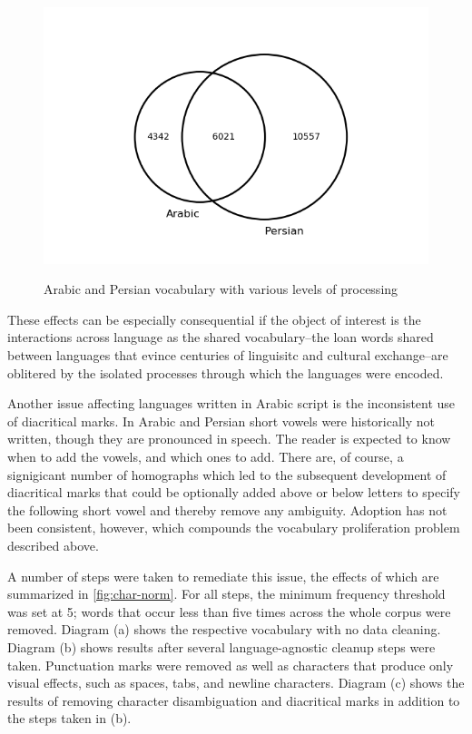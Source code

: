 \documentclass[12pt, oneside]{report}
\begin{document}
\begin{figure}
\begin{minipage}{\linewidth}
		\subcaption{}
		\label{fig:char-norm-b}
		\includegraphics[width=\linewidth]{figures/venn-proc-three-freq5.png}
		\subcaption{}
		\label{fig:char-norm-c}
	\end{minipage}
	\caption[Venn diagrams depicting the effects of various processing decisions]{Arabic and Persian vocabulary with various levels of processing}\label{fig:char-norm}
\end{figure}These effects can be especially consequential if the object of interest is the interactions across language as the shared vocabulary–the loan words shared between languages that evince centuries of linguisitc and cultural exchange–are oblitered by the isolated processes through which the languages were encoded. 
\par
Another issue affecting languages written in Arabic script is the inconsistent use of diacritical marks. In Arabic and Persian short vowels were historically not written, though they are 
pronounced in speech. The reader is expected to know when to add the vowels, and which ones to add. There are, of course, a signigicant number of homographs which led to the subsequent development of diacritical marks that could be optionally added above or below letters to specify the following short vowel and thereby remove any ambiguity. Adoption has not been consistent, however, which compounds the vocabulary proliferation problem described above. 
\par
A number of steps were taken to remediate this issue, the effects of which are summarized in
\autoref{fig:char-norm}. For all steps, the minimum frequency threshold was set at 5; words that occur less than five times across the whole corpus were removed. Diagram (a) shows the respective vocabulary with no data cleaning. Diagram (b) shows results after several language-agnostic cleanup steps were taken. Punctuation marks were removed as well as characters that produce only visual effects, such as spaces, tabs, and newline characters. Diagram (c) shows the results of removing character disambiguation and diacritical marks in addition to the steps taken in (b).
\end{document}
